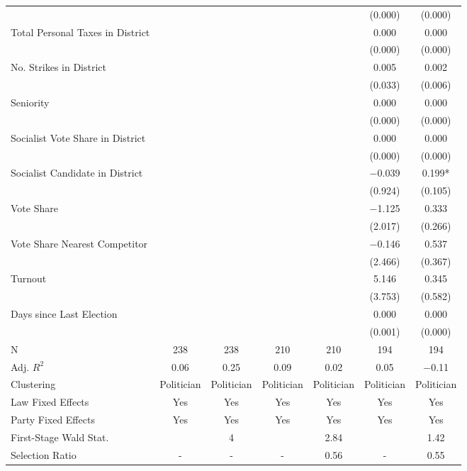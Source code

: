 \begin{table}[!h]
{\begin{threeparttable}
\begin{tabular}[t]{lcccccc}
 &  &  &  &  & (\num{0.000}) & \vphantom{3} (\num{0.000})\\
Total Personal Taxes in District &  &  &  &  & \num{0.000} & \num{0.000}\\
 &  &  &  &  & (\num{0.000}) & \vphantom{2} (\num{0.000})\\
No. Strikes in District &  &  &  &  & \num{0.005} & \num{0.002}\\
 &  &  &  &  & (\num{0.033}) & (\num{0.006})\\
Seniority &  &  &  &  & \num{0.000} & \num{0.000}\\
 &  &  &  &  & (\num{0.000}) & \vphantom{1} (\num{0.000})\\
Socialist Vote Share in District &  &  &  &  & \num{0.000} & \num{0.000}\\
 &  &  &  &  & (\num{0.000}) & (\num{0.000})\\
Socialist Candidate in District &  &  &  &  & \num{-0.039} & \num{0.199}*\\
 &  &  &  &  & (\num{0.924}) & (\num{0.105})\\
Vote Share &  &  &  &  & \num{-1.125} & \num{0.333}\\
 &  &  &  &  & (\num{2.017}) & (\num{0.266})\\
Vote Share Nearest Competitor &  &  &  &  & \num{-0.146} & \num{0.537}\\
 &  &  &  &  & (\num{2.466}) & (\num{0.367})\\
Turnout &  &  &  &  & \num{5.146} & \num{0.345}\\
 &  &  &  &  & (\num{3.753}) & (\num{0.582})\\
Days since Last Election &  &  &  &  & \num{0.000} & \num{0.000}\\
 &  &  &  &  & (\num{0.001}) & (\num{0.000})\\
\midrule
N & \num{238} & \num{238} & \num{210} & \num{210} & \num{194} & \num{194}\\
Adj. $R^2$ & \num{0.06} & \num{0.25} & \num{0.09} & \num{0.02} & \num{0.05} & \num{-0.11}\\
Clustering & Politician & Politician & Politician & Politician & Politician & Politician\\
Law Fixed Effects & Yes & Yes & Yes & Yes & Yes & Yes\\
Party Fixed Effects & Yes & Yes & Yes & Yes & Yes & Yes\\
First-Stage Wald Stat. &  & 4 &  & 2.84 &  & 1.42\\
Selection Ratio & - & - & - & 0.56 & - & 0.55\\

\end{tabular}
\end{threeparttable}}
\end{table}
